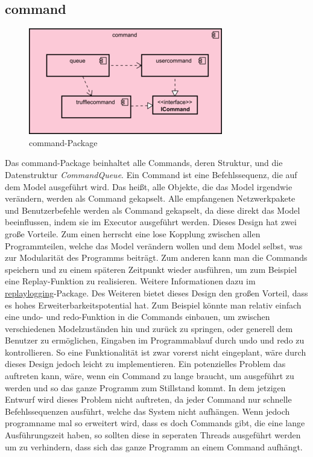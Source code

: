 \subsection{command}
\label{subsec:command}

\begin{figure}[H]
  \centering
  \includegraphics[width=\textwidth]{../diagramimages/command.png}
  \caption{command-Package}
\end{figure}

\medskip
Das command-Package beinhaltet alle Commands, deren Struktur, und die Datenstruktur
\textit{CommandQueue}. Ein Command ist eine Befehlssequenz, die auf
dem Model ausgeführt wird. Das heißt, alle Objekte, die das Model irgendwie verändern,
werden als Command gekapselt. Alle empfangenen Netzwerkpakete
und Benutzerbefehle werden als Command gekapselt, da diese direkt das Model beeinflussen,
indem sie im Executor ausgeführt werden.
\newline
\newline
Dieses Design hat zwei große Vorteile. Zum einen herrscht eine lose Kopplung zwischen
allen Programmteilen, welche das Model verändern wollen und dem Model selbst, was zur Modularität des
Programms beiträgt. Zum anderen kann man die Commands speichern und zu einem
späteren Zeitpunkt wieder ausführen, um zum Beispiel eine Replay-Funktion zu realisieren. Weitere Informationen dazu im
\hyperref[subsubsec:replaylogging]{replaylogging}-Package. Des Weiteren bietet dieses
Design den großen Vorteil, dass es hohes Erweiterbarkeitspotential hat. Zum Beispiel
könnte man relativ einfach eine undo- und redo-Funktion in die Commands einbauen, um
zwischen verschiedenen Modelzuständen hin und zurück zu springen, oder generell dem Benutzer zu ermöglichen, Eingaben im Programmablauf durch undo und redo zu kontrollieren. So eine
Funktionalität ist zwar vorerst nicht eingeplant, wäre durch dieses Design jedoch leicht zu implementieren.
\newline
\newline
Ein potenzielles Problem das auftreten kann, wäre, wenn ein Command zu lange braucht, um
ausgeführt zu werden und so das ganze Programm zum Stillstand kommt.
In dem jetzigen Entwurf wird dieses Problem nicht auftreten, da jeder Command
nur schnelle Befehlssequenzen ausführt, welche das System nicht
aufhängen. Wenn jedoch \gls{programname} mal so erweitert wird, dass es doch Commands gibt,
die eine lange Ausführungszeit haben, so sollten diese in seperaten Threads
ausgeführt werden um zu verhindern, dass sich das ganze Programm an einem Command
aufhängt.

